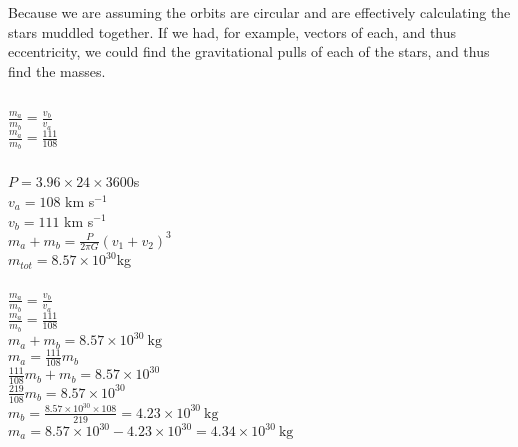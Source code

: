 \documentclass{article}
\begin{document}
\subsubsection{}
    \begin{center}
        Because we are assuming the orbits are circular and are effectively calculating the stars muddled together. If we had, for example, vectors of each, and thus eccentricity, we could find the gravitational pulls of each of the stars, and thus find the masses.
    \end{center}

\subsection{}
\subsubsection{}

\begin{center}
        \(\frac{m_a}{m_b} = \frac{v_b}{v_a}\)\\
        \(\frac{m_a}{m_b} = \frac{111}{108}\)
\end{center}

\subsubsection{}

\begin{center}
    \(P = 3.96 \times 24 \times 3600\)s \\
    \(v_a = 108 \) km s\(^{-1}\)\\
    \(v_b = 111 \) km s\(^{-1}\)\\
    \vspace{6mm}
    \(m_a + m_b = \frac{P}{2\pi G} (v_1 + v_2)^3 \)\\
    \(m_{tot} = 8.57 \times 10^{30}\)kg
\end{center}



\subsubsection{}
\begin{center}
    \(\frac{m_a}{m_b} = \frac{v_b}{v_a}\)\\
    \(\frac{m_a}{m_b} = \frac{111}{108}\)\\
    \(m_a + m_b = 8.57 \times 10^{30}\ \mathrm{kg}\)\\
    \(m_a = \frac{111}{108} m_b\)\\
    \(\frac{111}{108}m_b + m_b = 8.57 \times 10^{30}\)\\
    \(\frac{219}{108}m_b = 8.57 \times 10^{30}\)\\
    \(m_b = \frac{8.57 \times 10^{30} \times 108}{219} = 4.23 \times 10^{30}\ \mathrm{kg}\)\\
    \(m_a = 8.57 \times 10^{30} - 4.23 \times 10^{30} = 4.34 \times 10^{30}\ \mathrm{kg}\)
\end{center}
\end{document}

